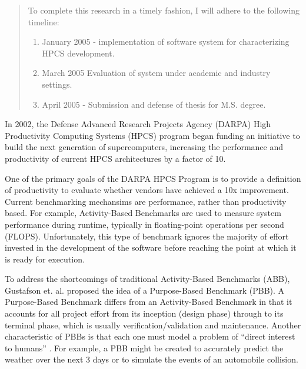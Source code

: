 \documentclass[11pt,twocolumn]{article}
\begin{document}
\begin{abstract}
To complete this research in a timely fashion, I will adhere to the
following timeline: 
\begin{enumerate} 
  \item January 2005 - implementation of software system for
  characterizing HPCS development.  
  \item March 2005 Evaluation of system under academic and industry settings. 
  \item April 2005 - Submission and defense of thesis for M.S. degree.
\end{enumerate}


\end{abstract}

\label{sec:intro}

In 2002, the Defense Advanced Research Projects Agency (DARPA) High
Productivity Computing Systems (HPCS) program began funding an initiative to
build the next generation of supercomputers, increasing the
performance and productivity of current HPCS architectures by a factor
of 10.

One of the primary goals of the DARPA HPCS Program is to provide a
definition of productivity to evaluate whether vendors have achieved a
10x improvement\cite{Faulk04}.  Current benchmarking mechansims are
performance, rather than productivity based.  For example,
Activity-Based Benchmarks are used to measure system performance
during runtime, typically in floating-point operations per second
(FLOPS).  Unfortunately, this type of benchmark ignores the majority
of effort invested in the development of the software before reaching
the point at which it is ready for execution.

To address the shortcomings of traditional Activity-Based Benchmarks (ABB),
Gustafson et. al. \cite{Gustafson04} proposed the idea of a Purpose-Based
Benchmark (PBB).  A Purpose-Based Benchmark differs from an
Activity-Based Benchmark in that it accounts for all project effort
from its inception (design phase) through to its terminal phase,
which is usually verification/validation and maintenance.  Another
characteristic of PBBs is that each one must model a problem of ``direct
interest to humans'' \cite{Gustafson04}.  For example, a PBB might be
created to accurately predict the weather over the next 3 days or to
simulate the events of an automobile collision.
\end{document}
